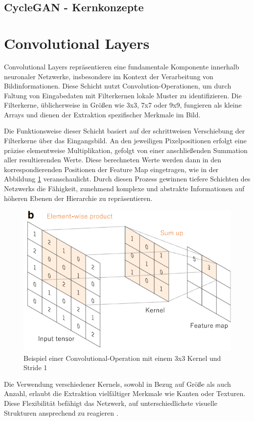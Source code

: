 \subsection{CycleGAN - Kernkonzepte}


\section{Convolutional Layers}
Convolutional Layers repräsentieren eine fundamentale Komponente innerhalb neuronaler Netzwerke, insbesondere im Kontext der Verarbeitung von Bildinformationen. Diese Schicht nutzt Convolution-Operationen, um durch Faltung von Eingabedaten mit Filterkernen lokale Muster zu identifizieren. Die Filterkerne, üblicherweise in Größen wie 3x3, 7x7 oder 9x9, fungieren als kleine Arrays und dienen der Extraktion spezifischer Merkmale im Bild.

Die Funktionsweise dieser Schicht basiert auf der schrittweisen Verschiebung der Filterkerne über das Eingangsbild. An den jeweiligen Pixelpositionen erfolgt eine präzise elementweise Multiplikation, gefolgt von einer anschließenden Summation aller resultierenden Werte. Diese berechneten Werte werden dann in den korrespondierenden Positionen der Feature Map eingetragen, wie in der Abbildung \ref{fig:convolutionalLayer} veranschaulicht. Durch diesen Prozess gewinnen tiefere Schichten des Netzwerks die Fähigkeit, zunehmend komplexe und abstrakte Informationen auf höheren Ebenen der Hierarchie zu repräsentieren.

\begin{figure}[ht]
	\centering
	\includegraphics[width=0.5\linewidth]{./images/convolutionalLayer.png}
	\caption{Beispiel einer Convolutional-Operation mit einem 3x3 Kernel und Stride 1\cite{Yamashita.2018}}
	\label{fig:convolutionalLayer}
\end{figure}

Die Verwendung verschiedener Kernels, sowohl in Bezug auf Größe als auch Anzahl, erlaubt die Extraktion vielfältiger Merkmale wie Kanten oder Texturen. Diese Flexibilität befähigt das Netzwerk, auf unterschiedlichste visuelle Strukturen ansprechend zu reagieren \cite{Yamashita.2018}.


